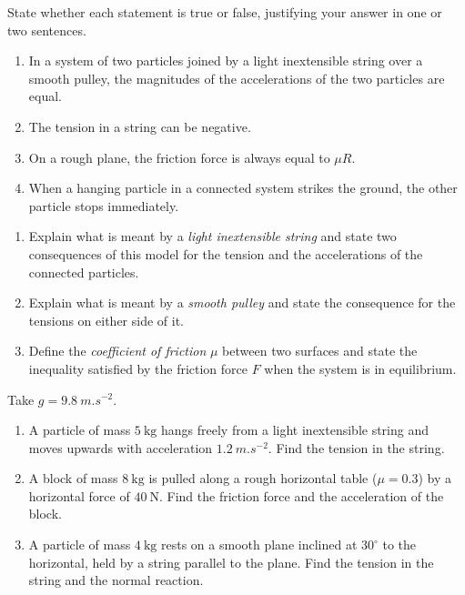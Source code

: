 \documentclass[11pt]{article}
\begin{document}
\begin{exercice}
State whether each statement is true or false, justifying your answer in one or two sentences.
\begin{enumerate}
\item In a system of two particles joined by a light inextensible string over a smooth pulley, the magnitudes of the accelerations of the two particles are equal.
\item The tension in a string can be negative.
\item On a rough plane, the friction force is always equal to $\mu R$.
\item When a hanging particle in a connected system strikes the ground, the other particle stops immediately.
\end{enumerate}
\end{exercice}

\begin{exercice}
\begin{enumerate}
\item Explain what is meant by a \emph{light inextensible string} and state two consequences of this model for the tension and the accelerations of the connected particles.
\item Explain what is meant by a \emph{smooth pulley} and state the consequence for the tensions on either side of it.
\item Define the \emph{coefficient of friction} $\mu$ between two surfaces and state the inequality satisfied by the friction force $F$ when the system is in equilibrium.
\end{enumerate}
\end{exercice}

\begin{exercice}
Take $g = \SI{9.8}{m.s^{-2}}$.
\begin{enumerate}
\item A particle of mass $5\ \mathrm{kg}$ hangs freely from a light inextensible string and moves upwards with acceleration $\SI{1.2}{m.s^{-2}}$. Find the tension in the string.
\item A block of mass $8\ \mathrm{kg}$ is pulled along a rough horizontal table ($\mu = 0.3$) by a horizontal force of $40\ \mathrm{N}$. Find the friction force and the acceleration of the block.
\item A particle of mass $4\ \mathrm{kg}$ rests on a smooth plane inclined at $30^{\circ}$ to the horizontal, held by a string parallel to the plane. Find the tension in the string and the normal reaction.
\end{enumerate}
\end{exercice}
\end{document}
